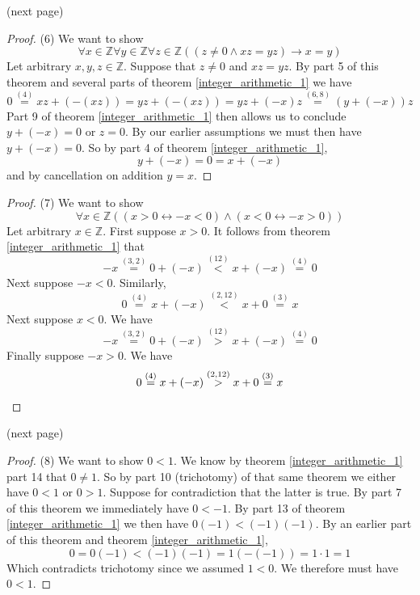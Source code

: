 \documentclass{report}
\begin{document}
\noindent(next page)\newpage
\begin{proof}(6)
We want to show
\begin{equation*}
\forall x\in\mathbb Z\forall y\in\mathbb Z\forall z\in\mathbb Z((z\neq0\land xz=yz)\to x=y)
\end{equation*}
Let arbitrary $x,y,z\in\mathbb Z$. Suppose that $z\neq0$ and $xz=yz$.
By part 5 of this theorem and several parts of theorem \ref{integer_arithmetic_1} we have
\begin{equation*}
0\overset{(4)}{=}xz+(-(xz))=yz+(-(xz))=yz+(-x)z\overset{(6,8)}{=}(y+(-x))z
\end{equation*}
Part 9 of theorem \ref{integer_arithmetic_1} then allows us to conclude $y+(-x)=0$ or $z=0$. By our earlier assumptions we must
then have $y+(-x)=0$. So by part 4 of theorem \ref{integer_arithmetic_1},
\begin{equation*}
y+(-x)=0=x+(-x)
\end{equation*}
and by cancellation on addition $y=x$.
\end{proof}
\begin{proof}(7)
We want to show
\begin{equation*}
\forall x\in\mathbb Z((x>0\leftrightarrow-x<0)\land(x<0\leftrightarrow-x>0))
\end{equation*}
Let arbitrary $x\in\mathbb Z$. First suppose $x>0$. It follows
from theorem \ref{integer_arithmetic_1} that
\begin{equation*}
-x\overset{(3,2)}{=}0+(-x)\overset{(12)}{<}x+(-x)\overset{(4)}{=}0
\end{equation*}
Next suppose $-x<0$. Similarly,
\begin{equation*}
0\overset{(4)}{=}x+(-x)\overset{(2,12)}{<}x+0\overset{(3)}{=}x
\end{equation*}
Next suppose $x<0$. We have
\begin{equation*}
-x\overset{(3,2)}{=}0+(-x)\overset{(12)}{>}x+(-x)\overset{(4)}{=}0
\end{equation*}
Finally suppose $-x>0$. We have
\begin{equation*}
0\overset{(4)}{=}x+(-x)\overset{(2,12)}{>}x+0\overset{(3)}{=}x\qedhere
\end{equation*}
\end{proof}
\noindent(next page)\newpage
\begin{proof}(8)
We want to show $0<1$. We know by theorem \ref{integer_arithmetic_1} part 14 that $0\neq1$. So by part 10 (trichotomy) of that
same theorem we either have $0<1$ or $0>1$. Suppose for contradiction that the latter is true. By part 7 of this theorem we
immediately have $0<-1$. By part 13 of theorem \ref{integer_arithmetic_1} we then have $0(-1)<(-1)(-1)$. By an earlier part
of this theorem and theorem \ref{integer_arithmetic_1},
\begin{equation*}
0=0(-1)<(-1)(-1)=1(-(-1))=1\cdot1=1
\end{equation*}
Which contradicts trichotomy since we assumed $1<0$. We therefore must have $0<1$.
\end{proof}
\end{document}
